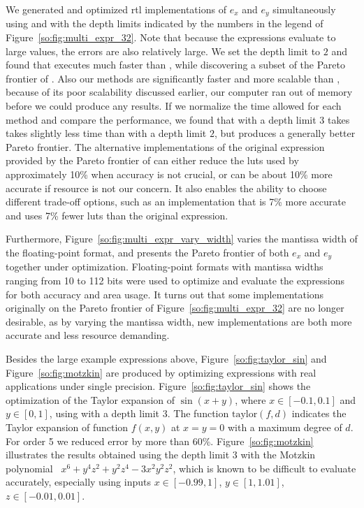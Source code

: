 We generated and optimized \gls{rtl} implementations of $e_x$ and
$e_y$ simultaneously using \frontiertrace{} and \greedytrace{}
with the depth limits indicated by the numbers in the legend of
Figure~\ref{so:fig:multi_expr_32}. Note that because the expressions
evaluate to large values, the errors are also relatively large. We set the
depth limit to $2$ and found that \greedytrace{} executes much faster than
\frontiertrace{}, while discovering a subset of the Pareto frontier of
\frontiertrace{}. Also our methods are significantly faster and more scalable
than \marteltrace{}, because of its poor scalability discussed earlier, our
computer ran out of memory before we could produce any results. If we normalize
the time allowed for each method and compare the performance, we found that
\greedytrace{} with a depth limit $3$ takes takes slightly less time than
\frontiertrace{} with a depth limit $2$, but produces a generally better Pareto
frontier. The alternative implementations of the original expression provided
by the Pareto frontier of \greedytrace{} can either reduce the \glspl{lut}
used by approximately 10\% when accuracy is not crucial, or can be about 10\%
more accurate if resource is not our concern.  It also enables the ability to
choose different trade-off options, such as an implementation that is 7\% more
accurate and uses 7\% fewer \glspl{lut} than the original expression.

Furthermore, Figure~\ref{so:fig:multi_expr_vary_width} varies the mantissa
width of the floating-point format, and presents the Pareto frontier
of both $e_x$ and $e_y$ together under optimization. Floating-point
formats with mantissa widths ranging from 10 to 112 bits were used to
optimize and evaluate the expressions for both accuracy and area usage. It
turns out that some implementations originally on the Pareto frontier of
Figure~\ref{so:fig:multi_expr_32} are no longer desirable, as by varying the
mantissa width, new implementations are both more accurate and less resource
demanding.

Besides the large example expressions above, Figure~\ref{so:fig:taylor_sin}
and Figure~\ref{so:fig:motzkin} are produced by optimizing expressions with
real applications under single precision. Figure~\ref{so:fig:taylor_sin} shows
the optimization of the Taylor expansion of $\sin(x + y)$, where $x\in[-0.1,
0.1]$ and $y\in[0, 1]$, using \greedytrace{} with a depth limit $3$. The
function $\mathrm{taylor}(f, d)$ indicates the Taylor expansion of function
$f(x, y)$ at $x = y = 0$ with a maximum degree of $d$. For order 5 we reduced
error by more than 60\%. Figure~\ref{so:fig:motzkin} illustrates the results
obtained using the depth limit $3$ with the Motzkin polynomial~\cite{demmel}
$x^6 + y^4 z^2 + y^2 z^4 - 3 x^2 y^2 z^2$, which is known to be difficult to
evaluate accurately, especially using inputs $x\in[-0.99, 1]$, $y\in[1, 1.01]$,
$z\in[-0.01, 0.01]$.

